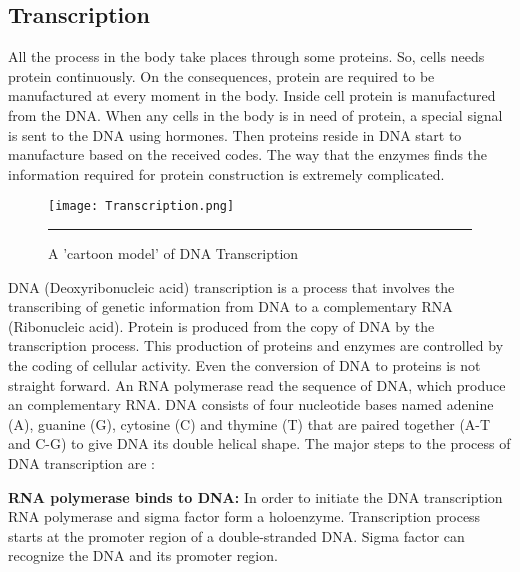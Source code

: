 \subsection{Transcription}
All the process in the body take places through some proteins. So, cells needs protein continuously. 
On the consequences, protein are required to be manufactured at every moment in the body. Inside cell 
protein is manufactured from the DNA. When any cells in the body is in need of protein, a special signal 
is sent to the DNA using hormones. Then proteins reside in DNA start to manufacture based on the 
received codes. The way that the enzymes finds the information required for protein construction is 
extremely complicated.

\begin{figure}%
	\centering
		 \texttt{[image: Transcription.png]} 
		\rule{35em}{0.5pt}
	\caption{A 'cartoon model' of DNA Transcription}
	\label{fig:transcription}
\end{figure}

DNA (Deoxyribonucleic acid) transcription is a process that involves the transcribing of 
genetic information from DNA to a complementary RNA (Ribonucleic acid). Protein is produced 
from the copy of DNA by the transcription process. This production of proteins and enzymes 
are controlled by the coding of cellular activity. Even the conversion of DNA to proteins 
is not straight forward. An RNA polymerase read the sequence of DNA, which produce an 
complementary RNA. DNA consists of four nucleotide bases named adenine (A), guanine (G), 
cytosine (C) and thymine (T) that are paired together (A-T and C-G) to give DNA its double 
helical shape. The major steps to the process of DNA transcription are :

\textbf{RNA polymerase binds to DNA:} In order to initiate the DNA transcription RNA polymerase and 
sigma factor form a holoenzyme. Transcription process starts at the promoter region of a 
double-stranded DNA. Sigma factor can recognize the DNA and its promoter region. 

